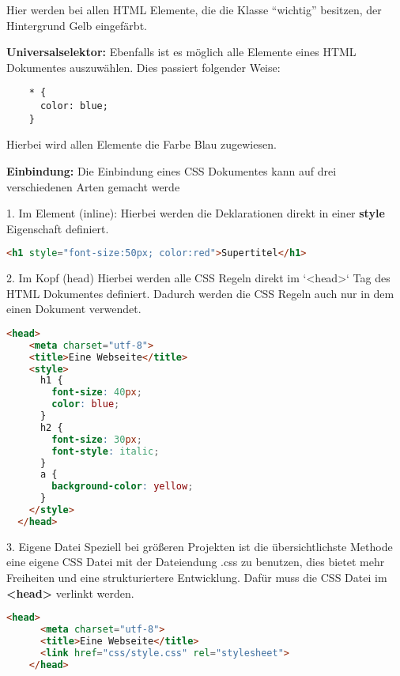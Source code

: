 Hier werden bei allen HTML Elemente, die die Klasse “wichtig” besitzen, der Hintergrund Gelb eingefärbt.

\textbf{Universalselektor:}
\newline
Ebenfalls ist es möglich alle Elemente eines HTML Dokumentes auszuwählen. Dies passiert folgender Weise:

\begin{lstlisting}
    * {
      color: blue;
    }
\end{lstlisting}

Hierbei wird allen Elemente die Farbe Blau zugewiesen.

\textbf{Einbindung:}
\newline
Die Einbindung eines CSS Dokumentes kann auf drei verschiedenen Arten gemacht werde

1. Im Element (inline):
\newline
Hierbei werden die Deklarationen direkt in einer \textbf{style} Eigenschaft definiert.

\begin{lstlisting}[language=html]
    <h1 style="font-size:50px; color:red">Supertitel</h1>
\end{lstlisting}

2. Im Kopf (head)
\newline
Hierbei werden alle CSS Regeln direkt im `<head>` Tag des HTML Dokumentes definiert. Dadurch werden die CSS Regeln auch nur in dem einen Dokument verwendet.

\begin{lstlisting}[language=html]
    <head>
    <meta charset="utf-8">
    <title>Eine Webseite</title>
    <style>
      h1 {
        font-size: 40px;
        color: blue;
      }
      h2 {
        font-size: 30px;
        font-style: italic;
      }
      a {
        background-color: yellow;
      }
    </style>
  </head>
\end{lstlisting}

3. Eigene Datei
\newline
Speziell bei größeren Projekten ist die übersichtlichste Methode eine eigene CSS Datei mit der Dateiendung .css zu benutzen, dies bietet mehr Freiheiten und eine strukturiertere Entwicklung. Dafür muss die CSS Datei im \textbf{<head>} verlinkt werden.

\begin{lstlisting}[language=html]
    <head>
      <meta charset="utf-8">
      <title>Eine Webseite</title>
      <link href="css/style.css" rel="stylesheet">
    </head>
\end{lstlisting}

\cite{frontend_web_css}



